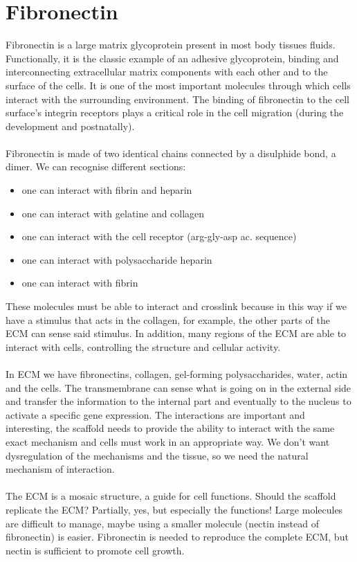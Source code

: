 \section{Fibronectin}
Fibronectin is a large matrix glycoprotein present in most body tissues fluids.
Functionally, it is the classic example of an adhesive glycoprotein, binding and interconnecting extracellular matrix components with each other and to the surface of the cells.
It is one of the most important molecules through which cells interact with the surrounding environment.
The binding of fibronectin to the cell surface’s integrin receptors plays a critical role in the cell migration (during the development and postnatally).
\\
\\
\noindent
Fibronectin is made of two identical chains connected by a disulphide bond, a dimer.
We can recognise different sections:
\begin{itemize}
\item one can interact with fibrin and heparin
\item one can interact with gelatine and collagen
\item one can interact with the cell receptor (arg-gly-asp ac. sequence)
\item one can interact with polysaccharide heparin
\item one can interact with fibrin
\end{itemize}
\noindent
These molecules must be able to interact and crosslink because in this way if we have a stimulus that acts in the collagen, for example, the other parts of the ECM can sense said stimulus. In addition, many regions of the ECM are able to interact with cells, controlling the structure and cellular activity.
\\
\\
\noindent
In ECM we have fibronectins, collagen, gel-forming polysaccharides, water, actin and the cells.
The transmembrane can sense what is going on in the external side and transfer the information to the internal part and eventually to the nucleus to activate a specific gene expression.
The interactions are important and interesting, the scaffold needs to provide the ability to interact with the same exact mechanism and cells must work in an appropriate way.
We don’t want dysregulation of the mechanisms and the tissue, so we need the natural mechanism of interaction.
\\
\\
\noindent
The ECM is a mosaic structure, a guide for cell functions.
Should the scaffold replicate the ECM? Partially, yes, but especially the functions! 
Large molecules are difficult to manage, maybe using a smaller molecule (nectin instead of fibronectin) is easier.
Fibronectin is needed to reproduce the complete ECM, but nectin is sufficient to promote cell growth.

